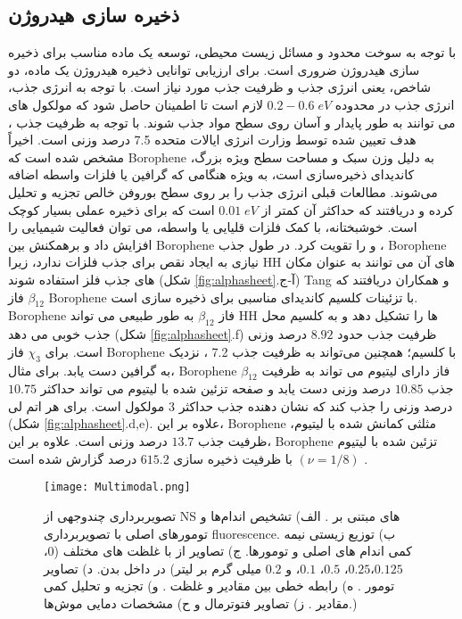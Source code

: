 \subsection{ذخیره سازی هیدروژن}
با توجه به سوخت محدود و مسائل زیست محیطی، توسعه یک ماده مناسب برای ذخیره سازی هیدروژن ضروری است. برای ارزیابی توانایی ذخیره هیدروژن یک ماده، دو شاخص، یعنی انرژی جذب و ظرفیت جذب  مورد نیاز است. با توجه به انرژی جذب، انرژی جذب در محدوده $0.2-0.6\; eV$ لازم است تا اطمینان حاصل شود که مولکول های  می توانند به طور پایدار و آسان روی سطح مواد جذب شوند. با توجه به ظرفیت جذب ، هدف تعیین شده توسط وزارت انرژی ایالات متحده 7.5 درصد وزنی است. اخیراً مشخص شده است که \gls{Borophene} به دلیل وزن سبک و مساحت سطح ویژه بزرگ، کاندیدای ذخیره‌سازی  است، به ویژه هنگامی که گرافین یا فلزات واسطه اضافه می‌شوند. مطالعات قبلی انرژی جذب  را بر روی سطح بوروفن خالص تجزیه و تحلیل کرده و دریافتند که حداکثر آن کمتر از $0.01\; eV$ است که برای ذخیره عملی  بسیار کوچک است.
خوشبختانه، با کمک فلزات قلیایی یا واسطه، می توان فعالیت شیمیایی را افزایش داد و برهمکنش بین \gls{Borophene} و  را تقویت کرد. در طول جذب ، \gls{Borophene} نیازی به ایجاد نقص برای جذب فلزات ندارد، زیرا \glsdesc{HH} های آن می توانند به عنوان مکان های جذب فلز استفاده شوند (شکل \ref{fig:alphasheet}.آ-ج) \cite{shangTwoDimensionalBoron2018} \gls{Tang} و همکاران \cite{tangTheoreticalInvestigationCalcium2018} دریافتند که فاز $\beta_{12}$ \gls{Borophene} با تزئینات کلسیم کاندیدای مناسبی برای ذخیره سازی  است. \gls{Borophene} فاز $\beta_{12}$ به طور طبیعی می تواند \glsdesc{HH} ها را تشکیل دهد و به کلسیم محل جذب خوبی می دهد (شکل \ref{fig:alphasheet}.f) \cite{wangCadecoratedNovelBoron2016} ظرفیت جذب  حدود $8.92$ درصد وزنی است. برای $\chi_3$ فاز \gls{Borophene} با کلسیم؛ همچنین می‌تواند به ظرفیت جذب  7.2 ، نزدیک به گرافین دست یابد. برای مثال، \gls{Borophene} $\beta_{12}$ فاز دارای لیتیوم می تواند به ظرفیت جذب  $10.85$ درصد وزنی دست یابد \cite{liuLiDecorated12BorophenePotential2017} و صفحه تزئین شده با لیتیوم می تواند حداکثر $10.75$ درصد وزنی  را جذب کند که نشان دهنده جذب حداکثر 3 مولکول  است. برای هر اتم لی (شکل \ref{fig:alphasheet}.d,e).\cite{erDFTStudyPlanar2009} علاوه بر این، \gls{Borophene} مثلثی کمانش شده با لیتیوم، ظرفیت جذب  $13.7$ درصد وزنی است.\cite{shangTwoDimensionalBoron2018, liHighHydrogenStorage2017} علاوه بر این، \gls{Borophene} تزئین شده با لیتیوم $(\nu= 1/8)$ با ظرفیت ذخیره سازی  $15.2$6 درصد گزارش شده است \cite{liUltrahighCapacityMolecularHydrogen2015}.

\begin{figure*}
    \centering
    \texttt{[image: Multimodal.png]}
    \caption{تصویربرداری چندوجهی از NS های مبتنی بر . الف) تشخیص اندام‌ها و تومورهای اصلی با تصویربرداری \gls{fluorescence}. ب) توزیع زیستی نیمه کمی اندام های اصلی و تومورها. ج) تصاویر  از  با غلظت های مختلف ($0$،$ 0.125$،$ 0.25$، $0.5$، $0.1$، و $0.2$ میلی گرم بر لیتر) در داخل بدن. د) تصاویر تومور . ه) رابطه خطی بین مقادیر  و غلظت . و) تجزیه و تحلیل کمی مقادیر . ز) تصاویر فتوترمال و ح) مشخصات دمایی موش‌ها.)}
    \label{fig:Multimodal}
\end{figure*}

